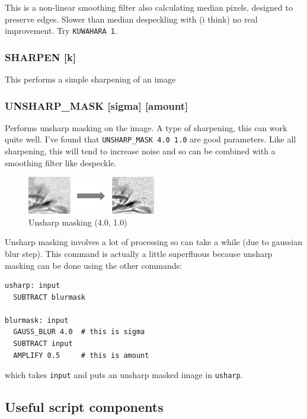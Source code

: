 \documentclass[12pt, a4paper]{article}
\begin{document}
This is a non-linear smoothing filter also calculating median pixels, 
designed to preserve edges. Slower than median despeckling with (i think) no
real improvement. Try \texttt{KUWAHARA 1}.


\subsubsection{SHARPEN [k]}

This performs a simple sharpening of an image

\subsubsection{UNSHARP\_MASK [sigma] [amount]}

Performs unsharp masking on the image. A type of sharpening, this can work quite well. I've found
that \texttt{UNSHARP\_MASK 4.0 1.0} are good parameters. Like all sharpening, this will tend to
increase noise and so can be combined with a smoothing filter like despeckle.

\begin{figure}[ht]
\centering
\includegraphics[width=0.5\textwidth]{unsharp_eg.png}
\caption{Unsharp masking (4.0, 1.0)}
\end{figure}

Unsharp masking involves a lot of processing so can take a while
(due to gaussian blur step).
This command is actually a little superfluous because unsharp masking
can be done using the other commands:
\begin{verbatim}
usharp: input
  SUBTRACT blurmask

blurmask: input
  GAUSS_BLUR 4.0  # this is sigma
  SUBTRACT input
  AMPLIFY 0.5     # this is amount
\end{verbatim}

\noindent which takes \texttt{input} and puts an unsharp masked image in \texttt{usharp}.

\subsection{Useful script components}
\end{document}
